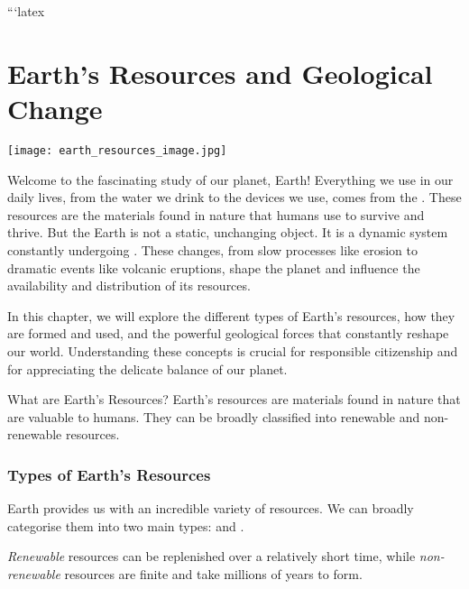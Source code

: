 ```latex
\chapter{Earth's Resources and Geological Change}

\begin{marginfigure}
\texttt{[image: earth\_resources\_image.jpg]}
\caption*{\textit{Image of diverse Earth resources: minerals, forests, water, and fossil fuels.}}
\end{marginfigure}

\FloatBarrier
\1

Welcome to the fascinating study of our planet, Earth!  Everything we use in our daily lives, from the water we drink to the devices we use, comes from the .  These resources are the materials found in nature that humans use to survive and thrive.  But the Earth is not a static, unchanging object. It is a dynamic system constantly undergoing .  These changes, from slow processes like erosion to dramatic events like volcanic eruptions, shape the planet and influence the availability and distribution of its resources.

In this chapter, we will explore the different types of Earth's resources, how they are formed and used, and the powerful geological forces that constantly reshape our world.  Understanding these concepts is crucial for responsible citizenship and for appreciating the delicate balance of our planet.

\begin{keyconcept}{What are Earth's Resources?}
Earth's resources are materials found in nature that are valuable to humans. They can be broadly classified into renewable and non-renewable resources.
\end{keyconcept}

\FloatBarrier
\1

\subsection{Types of Earth's Resources}

Earth provides us with an incredible variety of resources. We can broadly categorise them into two main types:  and .

\begin{marginnote}
\textit{Renewable} resources can be replenished over a relatively short time, while \textit{non-renewable} resources are finite and take millions of years to form.
\end{marginnote}

